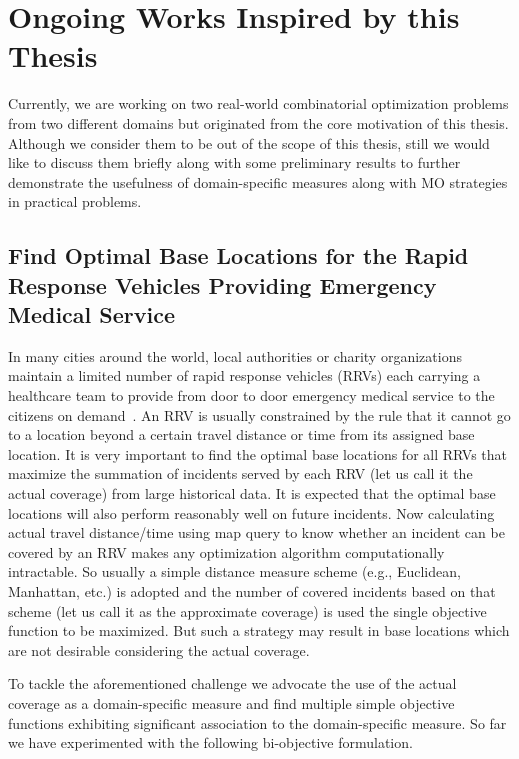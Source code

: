 \section{Ongoing Works Inspired by this Thesis}
Currently, we are working on two real-world combinatorial optimization problems from two different domains but originated from the core motivation of this thesis. Although we consider them to be out of the scope of this thesis, still we would like to discuss them briefly along with some preliminary results to further demonstrate the usefulness of domain-specific measures along with MO strategies in practical problems. 

\subsection{Find Optimal Base Locations for the Rapid Response Vehicles Providing Emergency Medical Service}
In many cities around the world, local authorities or charity organizations maintain a limited number of rapid response vehicles (RRVs) each carrying a healthcare team to provide from door to door emergency medical service to the citizens on demand~\cite{roislien2018comparing, van2019improving, benabdouallah2017comparison}. An RRV is usually constrained by the rule that it cannot go to a location beyond a certain travel distance or time from its assigned base location. It is very important to find the optimal base locations for all RRVs that maximize the summation of incidents served by each RRV (let us call it the actual coverage) from large historical data. It is expected that the optimal base locations will also perform reasonably well on future incidents. Now calculating actual travel distance/time using map query to know whether an incident can be covered by an RRV makes any optimization algorithm computationally intractable. So usually a simple distance measure scheme (e.g., Euclidean, Manhattan, etc.) is adopted and the number of covered incidents based on that scheme (let us call it as the approximate coverage) is used the single objective function to be maximized. But such a strategy may result in base locations which are not desirable considering the actual coverage.

To tackle the aforementioned challenge we advocate the use of the actual coverage as a domain-specific measure and find multiple simple objective functions exhibiting significant association to the domain-specific measure. So far we have experimented with the following bi-objective formulation.

